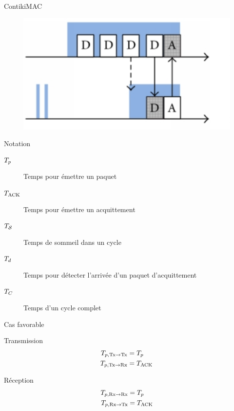 \begin{frame}{ContikiMAC}
  \begin{figure}
    \centering
    \includegraphics{figures/contikimac.png}
  \end{figure}
  \begin{block}{Notation}
    \begin{description}
      \item[$T_{p}$] Temps pour émettre un paquet
      \item[$T_{\textrm{ACK}}$] Temps pour émettre un acquittement
      \item[$T_{\mathcal{S}}$] Temps de sommeil dans un cycle
      \item[$T_{d}$] Temps pour détecter l'arrivée d'un paquet d'acquittement
      \item[$T_{C}$] Temps d'un cycle complet
    \end{description}
  \end{block}
\end{frame}

\begin{frame}{Cas favorable}

  \begin{block}{Transmission}
    \begin{align}
      T_{p, \textrm{Tx} \to \textrm{Tx}} &= T_{p}\\
      T_{p, \textrm{Tx} \to \textrm{Rx}} &= T_{\textrm{ACK}}
    \end{align}
  \end{block}

  \begin{block}{Réception}
    \begin{align}
      T_{p, \textrm{Rx} \to \textrm{Rx}} &= T_{p}\\
      T_{p, \textrm{Rx} \to \textrm{Tx}} &= T_{\textrm{ACK}}
    \end{align}
  \end{block}



\end{frame}

